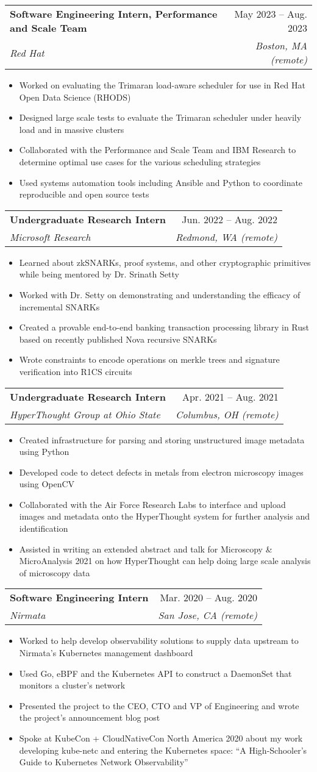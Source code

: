 \documentclass[letterpaper,11pt]{article}
\makeatletter
\newcommand{\resumeItem}[1]{
  \item\small{
    {#1 \vspace{-2pt}}
  }
}
\newcommand{\resumeSubheading}[4]{
  \vspace{-2pt}\item
    \begin{tabular*}{0.97\textwidth}[t]{l@{\extracolsep{\fill}}r}
      \textbf{#1} & #2 \\
      \textit{\small#3} & \textit{\small #4} \\
    \end{tabular*}\vspace{-7pt}
}
\newcommand{\resumeItemListStart}{\begin{itemize}}
\newcommand{\resumeItemListEnd}{\end{itemize}\vspace{-5pt}}
\makeatother
\begin{document}
      \resumeSubheading
      {Software Engineering Intern, Performance and Scale Team}{May 2023 -- Aug. 2023}
      {Red Hat}{Boston, MA (remote)}
      \resumeItemListStart
        \resumeItem{Worked on evaluating the Trimaran load-aware scheduler for use in Red Hat Open Data Science (RHODS)}
        \resumeItem{Designed large scale tests to evaluate the Trimaran scheduler under heavily load and in massive clusters}
        \resumeItem{Collaborated with the Performance and Scale Team and IBM Research to determine optimal use cases for the various scheduling strategies}
        \resumeItem{Used systems automation tools including Ansible and Python to coordinate reproducible and open source tests}
      \resumeItemListEnd

      \resumeSubheading
      {Undergraduate Research Intern}{Jun. 2022 -- Aug. 2022}
      {Microsoft Research}{Redmond, WA (remote)}
      \resumeItemListStart
        \resumeItem{Learned about zkSNARKs, proof systems, and other cryptographic primitives while being mentored by Dr. Srinath Setty}
        \resumeItem{Worked with Dr. Setty on demonstrating and understanding the efficacy of incremental SNARKs}
        \resumeItem{Created a provable end-to-end banking transaction processing library in Rust based on recently published Nova recursive SNARKs}
        \resumeItem{Wrote constraints to encode operations on merkle trees and signature verification into R1CS circuits}
      \resumeItemListEnd

    \resumeSubheading
      {Undergraduate Research Intern}{Apr. 2021 -- Aug. 2021}
      {HyperThought Group at Ohio State}{Columbus, OH (remote)}
      \resumeItemListStart
        \resumeItem{Created infrastructure for parsing and storing unstructured image metadata using Python}
        \resumeItem{Developed code to detect defects in metals from electron microscopy images using OpenCV}
        \resumeItem{Collaborated with the Air Force Research Labs to interface and upload images and metadata onto the HyperThought system for further analysis and identification}
        \resumeItem{Assisted in writing an extended abstract and talk for Microscopy \& MicroAnalysis 2021 on how HyperThought can help doing large scale analysis of microscopy data}
      \resumeItemListEnd


    \resumeSubheading
      {Software Engineering Intern}{Mar. 2020 -- Aug. 2020}
      {Nirmata}{San Jose, CA (remote)}
      \resumeItemListStart
        \resumeItem{Worked to help develop observability solutions to supply data upstream to Nirmata's Kubernetes management dashboard}
        \resumeItem{Used Go, eBPF and the Kubernetes API to construct a DaemonSet that monitors a cluster's network}
        \resumeItem{Presented the project to the CEO, CTO and VP of Engineering and wrote the project's announcement blog post}
        \resumeItem{Spoke at KubeCon + CloudNativeCon North America 2020 about my work developing kube-netc and entering the Kubernetes space: ``A High-Schooler's Guide to Kubernetes Network Observability''}
      \resumeItemListEnd
\end{document}
